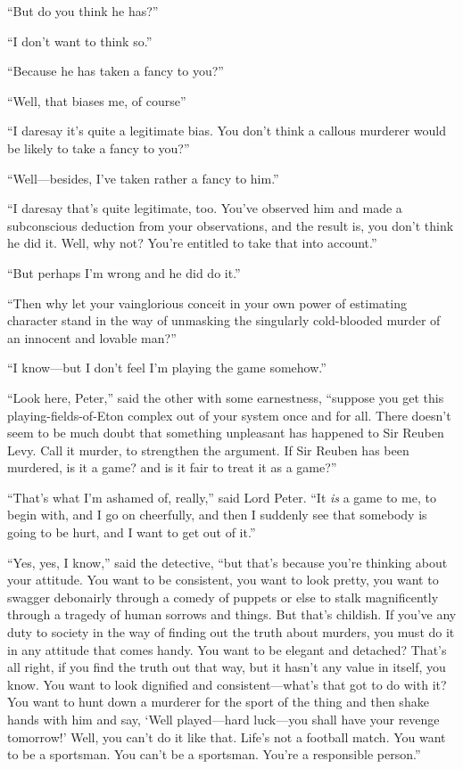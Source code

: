 \enquote{But do you think he has?}

\enquote{I don’t want to think so.}

\enquote{Because he has taken a fancy to you?}

\enquote{Well, that biases me, of course\longdash}

\enquote{I daresay it’s quite a legitimate bias. You don’t think a callous murderer would be likely to take a fancy to you?}

\enquote{Well\allowbreak---\allowbreak besides, I’ve taken rather a fancy to him.}

\enquote{I daresay that’s quite legitimate, too. You’ve observed him and made a subconscious deduction from your observations, and the result is, you don’t think he did it. Well, why not? You’re entitled to take that into account.}

\enquote{But perhaps I’m wrong and he did do it.}

\enquote{Then why let your vainglorious conceit in your own power of estimating character stand in the way of unmasking the singularly cold-blooded murder of an innocent and lovable man?}

\enquote{I know\allowbreak---\allowbreak but I don’t feel I’m playing the game somehow.}

\enquote{Look here, Peter,} said the other with some earnestness, \enquote{suppose you get this playing-fields-of-Eton complex out of your system once and for all. There doesn’t seem to be much doubt that something unpleasant has happened to Sir Reuben Levy. Call it murder, to strengthen the argument. If Sir Reuben has been murdered, is it a game? and is it fair to treat it as a game?}

\enquote{That’s what I’m ashamed of, really,} said Lord Peter. \enquote{It \textit{is} a game to me, to begin with, and I go on cheerfully, and then I suddenly see that somebody is going to be hurt, and I want to get out of it.}

\enquote{Yes, yes, I know,} said the detective, \enquote{but that’s because you’re thinking about your attitude. You want to be consistent, you want to look pretty, you want to swagger debonairly through a comedy of puppets or else to stalk magnificently through a tragedy of human sorrows and things. But that’s childish. If you’ve any duty to society in the way of finding out the truth about murders, you must do it in any attitude that comes handy. You want to be elegant and detached? That’s all right, if you find the truth out that way, but it hasn’t any value in itself, you know. You want to look dignified and consistent\allowbreak---\allowbreak what’s that got to do with it? You want to hunt down a murderer for the sport of the thing and then shake hands with him and say, \enquote{Well played\allowbreak---\allowbreak hard luck\allowbreak---\allowbreak you shall have your revenge tomorrow!} Well, you can’t do it like that. Life’s not a football match. You want to be a sportsman. You can’t be a sportsman. You’re a responsible person.}

